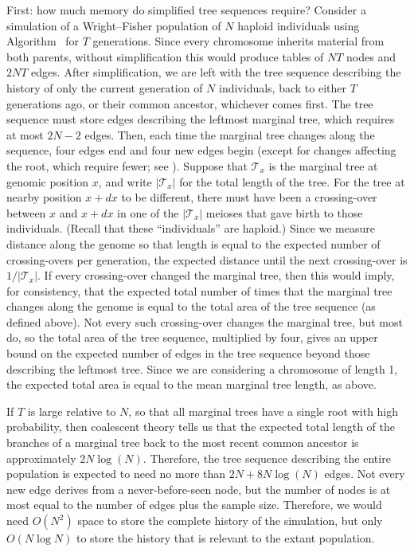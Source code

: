 \documentclass{article}
\begin{document}
First: how much memory do simplified tree sequences require?
Consider a simulation of a Wright--Fisher population of $N$ haploid individuals
using Algorithm~ for $T$ generations.
Since every chromosome inherits material from both parents,
without simplification this would produce tables of
$NT$ nodes and $2NT$ edges.
After simplification, we are left with the tree sequence describing the history
of only the current generation of $N$ individuals, back to either $T$ generations ago,
or their common ancestor, whichever comes first.
The tree sequence must store edges describing the leftmost marginal tree,
which requires at most $2N-2$ edges.
Then, each time the marginal tree changes along the sequence,
four edges end and four new edges begin
(except for changes affecting the root, which require fewer; see \citet{kelleher2016efficient}).
Suppose that $\mathcal{T}_x$ is the marginal tree at genomic position $x$,
and write $|\mathcal{T}_x|$ for the total length of the tree.
For the tree at nearby position $x + dx$ to be different,
there must have been a crossing-over between $x$ and $x + dx$
in one of the $|\mathcal{T}_x|$ meioses that gave birth to those individuals.
(Recall that these ``individuals'' are haploid.)
Since we measure distance along the genome
so that length is equal to the expected number of crossing-overs per generation,
the expected distance until the next crossing-over is $1/|\mathcal{T}_x|$.
If every crossing-over changed the marginal tree,
then this would imply, for consistency,
that the expected total number of times that the marginal tree changes along the genome
is equal to the total area of the tree sequence (as defined above).
Not every such crossing-over changes the marginal tree, but most do,
so the total area of the tree sequence,
multiplied by four,
gives an upper bound on the expected number of edges in the tree sequence
beyond those describing the leftmost tree.
Since we are considering a chromosome of length 1,
the expected total area is equal to the mean marginal tree length, as above.

If $T$ is large relative to $N$,
so that all marginal trees have a single root with high probability,
then coalescent theory tells us that
the expected total length of the branches of a marginal tree back to the most recent common ancestor
is approximately $2N\log(N)$.
Therefore, the tree sequence describing the entire population
is expected to need no more than $2N + 8N\log(N)$ edges.
Not every new edge derives from a never-before-seen node,
but the number of nodes is at most equal to the number of edges plus the sample size.
Therefore,
we would need $O(N^2)$ space to store the complete history of the simulation,
but only $O(N \log N)$ %
to store the history that is relevant to the extant population.
\end{document}
